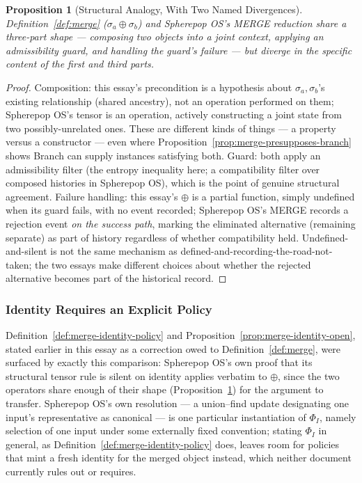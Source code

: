 \documentclass[11pt]{article}
\newtheorem{proposition}[theorem]{Proposition}
\theoremstyle{definition}
\begin{document}
\begin{proposition}[Structural Analogy, With Two Named Divergences]
\label{prop:merge-same-shape}
Definition~\ref{def:merge} ($\sigma_a \oplus \sigma_b$) and Spherepop OS's MERGE reduction share a three-part shape --- composing two objects into a joint context, applying an admissibility guard, and handling the guard's failure --- but diverge in the specific content of the first and third parts.
\end{proposition}
\begin{proof}
Composition: this essay's precondition is a hypothesis about $\sigma_a, \sigma_b$'s existing relationship (shared ancestry), not an operation performed on them; Spherepop OS's tensor is an operation, actively constructing a joint state from two possibly-unrelated ones. These are different kinds of things --- a property versus a constructor --- even where Proposition~\ref{prop:merge-presupposes-branch} shows Branch can supply instances satisfying both. Guard: both apply an admissibility filter (the entropy inequality here; a compatibility filter over composed histories in Spherepop OS), which is the point of genuine structural agreement. Failure handling: this essay's $\oplus$ is a partial function, simply undefined when its guard fails, with no event recorded; Spherepop OS's MERGE records a rejection event \emph{on the success path}, marking the eliminated alternative (remaining separate) as part of history regardless of whether compatibility held. Undefined-and-silent is not the same mechanism as defined-and-recording-the-road-not-taken; the two essays make different choices about whether the rejected alternative becomes part of the historical record.
\end{proof}

\subsubsection{Identity Requires an Explicit Policy}

Definition~\ref{def:merge-identity-policy} and Proposition~\ref{prop:merge-identity-open}, stated earlier in this essay as a correction owed to Definition~\ref{def:merge}, were surfaced by exactly this comparison: Spherepop OS's own proof that its structural tensor rule is silent on identity applies verbatim to $\oplus$, since the two operators share enough of their shape (Proposition~\ref{prop:merge-same-shape}) for the argument to transfer. Spherepop OS's own resolution --- a union--find update designating one input's representative as canonical --- is one particular instantiation of $\Phi_I$, namely selection of one input under some externally fixed convention; stating $\Phi_I$ in general, as Definition~\ref{def:merge-identity-policy} does, leaves room for policies that mint a fresh identity for the merged object instead, which neither document currently rules out or requires.
\end{document}
